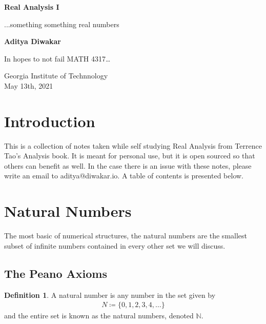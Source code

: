 \documentclass[14pt]{extarticle}
\theoremstyle{definition}
\theoremstyle{axiom}
\newtheorem{definition}{Definition}[subsection]
\begin{document}
\begin{titlepage}
   \begin{center}
       \vspace*{1cm}

       \textbf{\LARGE Real Analysis I}

       \vspace{0.5cm}

       {\Large ...something something real numbers}
            
       \vspace{1.5cm}

       \textbf{\Large Aditya Diwakar}

       \vfill
            
       \large{In hopes to not fail MATH 4317\dots
            
       \vspace{0.8cm}
     
       Georgia Institute of Technnology\\
       May 13th, 2021}
            
   \end{center}
\end{titlepage}

\section{Introduction}
This is a collection of notes taken while self studying Real Analysis from Terrence Tao's Analysis book.
It is meant for personal use, but it is open sourced so that others can benefit as well. In the case
there is an issue with these notes, please write an email to aditya@diwakar.io. A table of contents is
presented below.

\tableofcontents
\pagebreak
\setcounter{tocdepth}{3}

\section{Natural Numbers}
\localtableofcontents

\vspace{0.5cm}

\noindent
The most basic of numerical structures, the natural numbers are the smallest subset of infinite numbers
contained in every other set we will discuss.

\subsection{The Peano Axioms}
\begin{definition}
    A natural number is any number in the set given by
    \begin{align*}
        N \coloneqq \{0, 1, 2, 3, 4, \dots\}
    \end{align*}
    and the entire set is known as the natural numbers, denoted $\mathbb{N}$.
\end{definition}
\end{document}

